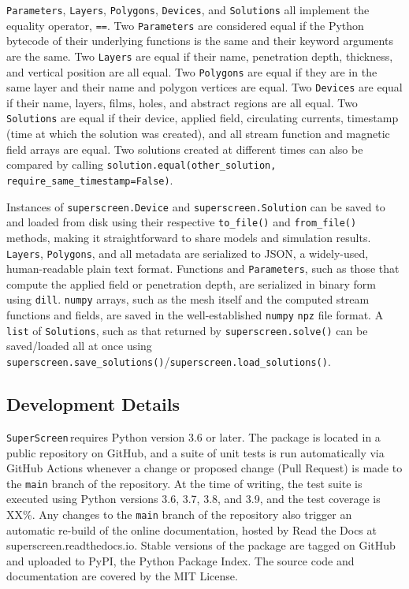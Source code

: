 \documentclass{article}
\newcommand{\SuperScreen}{\texttt{SuperScreen}\,}
\begin{document}
\texttt{Parameters}, \texttt{Layers}, \texttt{Polygons}, \texttt{Devices}, and \texttt{Solutions} all implement the equality operator, \texttt{==}. Two \texttt{Parameters} are considered equal if the Python bytecode of their underlying functions is the same and their keyword arguments are the same. Two \texttt{Layers} are equal if their name, penetration depth, thickness, and vertical position are all equal. Two \texttt{Polygons} are equal if they are in the same layer and their name and polygon vertices are equal. Two \texttt{Devices} are equal if their name, layers, films, holes, and abstract regions are all equal. Two \texttt{Solutions} are equal if their device, applied field, circulating currents, timestamp (time at which the solution was created), and all stream function and magnetic field arrays are equal. Two solutions created at different times can also be compared by calling \texttt{solution.equal(other_solution, require_same_timestamp=False)}.

Instances of \texttt{superscreen.Device} and \texttt{superscreen.Solution} can be saved to and loaded from disk using their respective \texttt{to_file()} and \texttt{from_file()} methods, making it straightforward to share models and simulation results. \texttt{Layers}, \texttt{Polygons}, and all metadata are serialized to JSON, a widely-used, human-readable plain text format. Functions and \texttt{Parameters}, such as those that compute the applied field or penetration depth, are serialized in binary form using \texttt{dill}. \texttt{numpy} arrays, such as the mesh itself and the computed stream functions and fields, are saved in the well-established \texttt{numpy} \texttt{npz} file format. A \texttt{list} of \texttt{Solutions}, such as that returned by \texttt{superscreen.solve()} can be saved/loaded all at once using \texttt{superscreen.save_solutions()}/\texttt{superscreen.load_solutions()}.

\subsection{Development Details}
\label{section:overview:development}

\SuperScreen requires Python version 3.6 or later. The package is located in a public repository on GitHub, and a suite of unit tests is run automatically via GitHub Actions whenever a change or proposed change (Pull Request) is made to the \texttt{main} branch of the repository. At the time of writing, the test suite is executed using Python versions 3.6, 3.7, 3.8, and 3.9, and the test coverage is XX\%. Any changes to the \texttt{main} branch of the repository also trigger an automatic re-build of the online documentation, hosted by Read the Docs at superscreen.readthedocs.io. Stable versions of the package are tagged on GitHub and uploaded to PyPI, the Python Package Index. The source code and documentation are covered by the MIT License.
\end{document}
